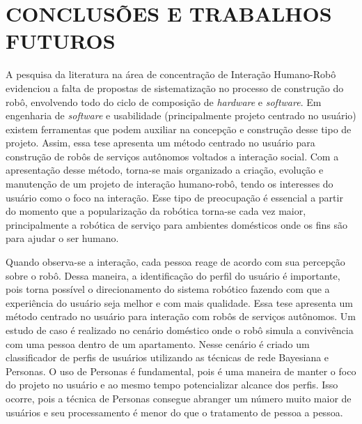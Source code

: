 \chapter{CONCLUSÕES E TRABALHOS FUTUROS}
\label{cap:conclusoes}
A pesquisa da literatura na área de concentração de Interação Humano-Robô evidenciou a falta de propostas de sistematização no processo de construção do robô, envolvendo todo do ciclo de composição de \textit{hardware} e \textit{software}. Em engenharia de \textit{software} e usabilidade (principalmente projeto centrado no usuário) existem ferramentas que podem auxiliar na concepção e construção desse tipo de projeto. Assim, essa tese apresenta um método centrado no usuário para construção de robôs de serviços autônomos voltados a interação social. Com a apresentação desse método, torna-se mais organizado a criação, evolução e manutenção de um projeto de interação humano-robô, tendo os interesses do usuário como o foco na interação. Esse tipo de preocupação é essencial a partir do momento que a popularização da robótica torna-se cada vez maior, principalmente a robótica de serviço para ambientes domésticos onde os fins são para ajudar o ser humano.

Quando observa-se a interação, cada pessoa reage de acordo com sua percepção sobre o robô. Dessa maneira, a identificação do perfil do usuário é importante, pois torna possível o direcionamento do sistema robótico fazendo com que a experiência do usuário seja melhor e com mais qualidade. Essa tese apresenta um método centrado no usuário para interação com robôs de serviços autônomos. Um estudo de caso é realizado no cenário doméstico onde o robô simula a convivência com uma pessoa dentro de um apartamento. Nesse cenário é criado um classificador de perfis de usuários utilizando as técnicas de rede Bayesiana e Personas. O uso de Personas é fundamental, pois é uma maneira de manter o foco do projeto no usuário e ao mesmo tempo potencializar alcance dos perfis. Isso ocorre, pois a técnica de Personas consegue abranger um número muito maior de usuários e seu processamento é menor do que o tratamento de pessoa a pessoa. 


